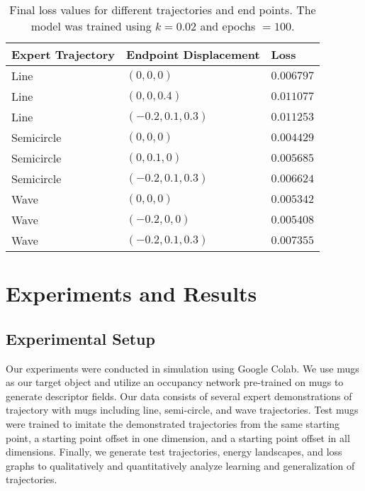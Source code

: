 \documentclass[10pt,twocolumn,letterpaper]{article}
\begin{document}
\begin{table}[t]
\begin{center}
\begin{tabular}{|l|l|l|}
\hline
Expert Trajectory & Endpoint Displacement & Loss \\
\hline\hline
Line        & $(0, 0, 0)$         & $0.006797$ \\
Line        & $(0, 0, 0.4)$       & $0.011077$ \\
Line        & $(-0.2, 0.1, 0.3)$  & $0.011253$ \\
Semicircle  & $(0, 0, 0)$         & $0.004429$ \\
Semicircle  & $(0, 0.1, 0)$       & $0.005685$ \\
Semicircle  & $(-0.2, 0.1, 0.3)$  & $0.006624$ \\
Wave        & $(0, 0, 0)$         & $0.005342$ \\
Wave        & $(-0.2, 0, 0)$      & $0.005408$ \\
Wave        & $(-0.2, 0.1, 0.3)$  & $0.007355$ \\
\hline
\end{tabular}
\end{center}
\caption{Final loss values for different trajectories and end points. The model was trained using $k = 0.02$ and epochs $= 100$.}
\label{tab:losses}
\end{table}

\section{Experiments and Results}

\subsection{Experimental Setup}
\label{setup}

Our experiments were conducted in simulation using Google Colab. We use mugs as our target object and utilize an occupancy network pre-trained on mugs to generate descriptor fields. Our data consists of several expert demonstrations of trajectory with mugs including line, semi-circle, and wave trajectories. Test mugs were trained to imitate the demonstrated trajectories from the same starting point, a starting point offset in one dimension, and a starting point offset in all dimensions. Finally, we generate test trajectories, energy landscapes, and loss graphs to qualitatively and quantitatively analyze learning and generalization of trajectories.
\end{document}
